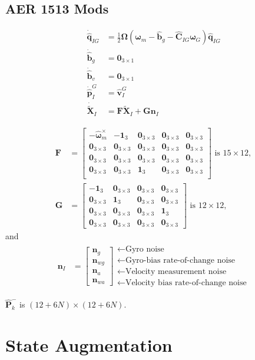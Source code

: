 \documentclass[10pt,letterpaper,fleqn,oneside]{article}
\newcommand{\nl}{\\[0.5em]}
\def\Vec#1{\mathbf{#1}} %
\newcommand{\bbm}{\begin{bmatrix}}
\newcommand{\ebm}{\end{bmatrix}}
\begin{document}
\subsection{AER 1513 Mods}
\begin{align}
\dot{\hat{\Vec{q}}}_{I G} &= \frac{1}{2}\boldsymbol{\Omega}\left(\boldsymbol{\omega}_m - \hat{\Vec{b}}_g - \hat{\Vec{C}}_{I G} \boldsymbol{\omega}_G \right)\hat{\Vec{q}}_{I G} \nl
\dot{\hat{\Vec{b}}}_g  &= \Vec{0}_{3\times1} \nl
\dot{\hat{\Vec{b}}}_v &= \Vec{0}_{3\times1} \nl
\dot{\hat{\Vec{p}}}^G_I &= \hat{\Vec{v}}^G_I \nl
\dot{\widetilde{\Vec{X}}}_I &= \Vec{F}\widetilde{\Vec{X}}_I + \Vec{G}\Vec{n}_I
\end{align}

\begin{align}
\Vec{F} &= \bbm	-\hat{\boldsymbol{\omega}}_m^\times & -\Vec{1}_3 & \Vec{0}_{3\times3} & \Vec{0}_{3\times3} & \Vec{0}_{3\times3} \nl
					\Vec{0}_{3\times3} & \Vec{0}_{3\times3} & \Vec{0}_{3\times3} & \Vec{0}_{3\times3} & \Vec{0}_{3\times3} \nl
					\Vec{0}_{3\times3} & \Vec{0}_{3\times3} & \Vec{0}_{3\times3} & \Vec{0}_{3\times3} & \Vec{0}_{3\times3} \nl
					\Vec{0}_{3\times3} & \Vec{0}_{3\times3} & \Vec{1}_3 & \Vec{0}_{3\times3} & \Vec{0}_{3\times3} \nl
		\ebm \text{ is } 15\times12, \nl
\Vec{G} &= 	\bbm	-\Vec{1}_3 & \Vec{0}_{3\times3} & \Vec{0}_{3\times3} & \Vec{0}_{3\times3} \nl
								\Vec{0}_{3\times3} & \Vec{1}_3 & \Vec{0}_{3\times3} & \Vec{0}_{3\times3} \nl
								\Vec{0}_{3\times3} & \Vec{0}_{3\times3} & \Vec{0}_{3\times3} & \Vec{1}_3 \nl
								\Vec{0}_{3\times3} & \Vec{0}_{3\times3} & \Vec{0}_{3\times3} & \Vec{0}_{3\times3}
					\ebm \text{ is } 12\times12,
\end{align}
and
\begin{align}
\Vec{n}_I &= \bbm \Vec{n}_g \nl \Vec{n}_{wg} \nl \Vec{n}_a \nl \Vec{n}_{wa} \ebm
					\begin{array}{l}
					\leftarrow \text{Gyro noise} \nl
					\leftarrow \text{Gyro-bias rate-of-change noise} \nl
					\leftarrow \text{Velocity measurement noise} \nl
					\leftarrow \text{Velocity bias rate-of-change noise}
					\end{array}		
\end{align}

$\hat{\Vec{P}}^-_k$ is $(12+6N)\times(12+6N)$.


\section{State Augmentation}
\end{document}
